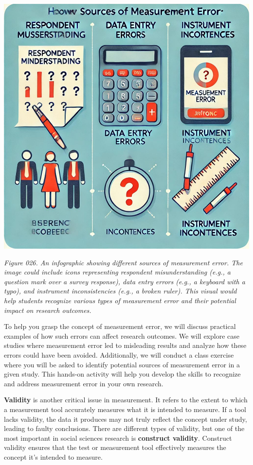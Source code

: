 \documentclass[
]{book}
\begin{document}
\includegraphics[width=1\textwidth,height=\textheight]{images/fig026.jpg}

\emph{Figure 026. An infographic showing different sources of measurement error. The image could include icons representing respondent misunderstanding (e.g., a question mark over a survey response), data entry errors (e.g., a keyboard with a typo), and instrument inconsistencies (e.g., a broken ruler). This visual would help students recognize various types of measurement error and their potential impact on research outcomes.}

To help you grasp the concept of measurement error, we will discuss practical examples of how such errors can affect research outcomes. We will explore case studies where measurement error led to misleading results and analyze how these errors could have been avoided. Additionally, we will conduct a class exercise where you will be asked to identify potential sources of measurement error in a given study. This hands-on activity will help you develop the skills to recognize and address measurement error in your own research.

\textbf{Validity} is another critical issue in measurement. It refers to the extent to which a measurement tool accurately measures what it is intended to measure. If a tool lacks validity, the data it produces may not truly reflect the concept under study, leading to faulty conclusions. There are different types of validity, but one of the most important in social sciences research is \textbf{construct validity}. Construct validity ensures that the test or measurement tool effectively measures the concept it's intended to measure.
\end{document}
